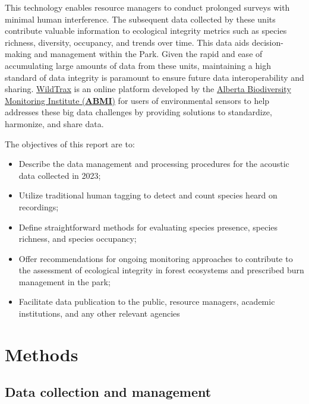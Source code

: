 \documentclass[
  letterpaper,
  DIV=11,
  numbers=noendperiod,
  oneside]{scrartcl}
\providecommand{\tightlist}{%
  \setlength{\itemsep}{0pt}\setlength{\parskip}{0pt}}\usepackage{longtable,booktabs,array}
\begin{document}
This technology enables resource managers to conduct prolonged surveys
with minimal human interference. The subsequent data collected by these
units contribute valuable information to ecological integrity metrics
such as species richness, diversity, occupancy, and trends over time.
This data aids decision-making and management within the Park. Given the
rapid and ease of accumulating large amounts of data from these units,
maintaining a high standard of data integrity is paramount to ensure
future data interoperability and sharing.
\href{https://www.wildtrax.ca}{WildTrax} is an online platform developed
by the \href{https://abmi.ca}{Alberta Biodiversity Monitoring Institute
(\textbf{ABMI})} for users of environmental sensors to help addresses
these big data challenges by providing solutions to standardize,
harmonize, and share data.

The objectives of this report are to:

\begin{itemize}
\tightlist
\item
  Describe the data management and processing procedures for the
  acoustic data collected in 2023;
\item
  Utilize traditional human tagging to detect and count species heard on
  recordings;
\item
  Define straightforward methods for evaluating species presence,
  species richness, and species occupancy;
\item
  Offer recommendations for ongoing monitoring approaches to contribute
  to the assessment of ecological integrity in forest ecosystems and
  prescribed burn management in the park;
\item
  Facilitate data publication to the public, resource managers, academic
  institutions, and any other relevant agencies
\end{itemize}

\hypertarget{methods}{%
\section{Methods}\label{methods}}

\hypertarget{data-collection-and-management}{%
\subsection{Data collection and
management}\label{data-collection-and-management}}
\end{document}
